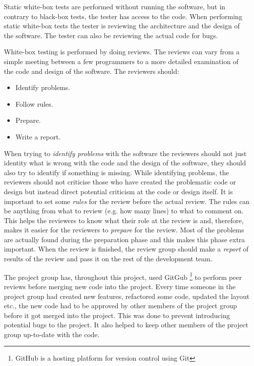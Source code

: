 Static white-box tests are performed without running the software, but in contrary to black-box tests, the tester has access to the code. %
When performing static white-box tests the tester is reviewing the architecture and the design of the software.
The tester can also be reviewing the actual code for bugs. \cite{SoftwareTesting} %

White-box testing is performed by doing reviews.
The reviews can vary from a simple meeting between a few programmers to a more detailed examination of the code and design of the software.
The reviewers should: \cite{SoftwareTesting}

\begin{itemize}
	\item Identify problems.
	\item Follow rules.
	\item Prepare.
	\item Write a report.
\end{itemize}

When trying to \textit{identify problems} with the software the reviewers should not just identity what is wrong with the code and the design of the software, they should also try to identify if something is missing.
While identifying problems, the reviewers should not criticise those who have created the problematic code or design but instead direct potential criticism at the code or design itself.
It is important to set some \textit{rules} for the review before the actual review.
The rules can be anything from what to review (e.g. how many lines) to what to comment on.
This helps the reviewers to know what their role at the review is and, therefore, makes it easier for the reviewers to \textit{prepare} for the review.
Most of the problems are actually found during the preparation phase and this makes this phase extra important.
When the review is finished, the review group should make a \textit{report} of results of the review and pass it on the rest of the development team. \cite{SoftwareTesting}

The project group has, throughout this project, used GitGub \footnote{GitHub is a hosting platform for version control using Git} to perform peer reviews before merging new code into the project. %
Every time someone in the project group had created new features, refactored some code, updated the layout etc., the new code had to be approved by other members of the project group before it got merged into the project.
This was done to prevent introducing potential bugs to the project.
It also helped to keep other members of the project group up-to-date with the code.


